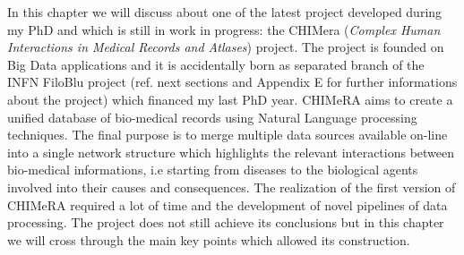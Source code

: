 \documentclass{standalone}
\begin{document}
In this chapter we will discuss about one of the latest project developed during my PhD and which is still in work in progress: the CHIMera (\emph{Complex Human Interactions in Medical Records and Atlases}) project.
The project is founded on Big Data applications and it is accidentally born as separated branch of the INFN FiloBlu project (ref. next sections and Appendix E for further informations about the project) which financed my last PhD year.
CHIMeRA aims to create a unified database of bio-medical records using Natural Language processing techniques.
The final purpose is to merge multiple data sources available on-line into a single network structure which highlights the relevant interactions between bio-medical informations, i.e starting from diseases to the biological agents involved into their causes and consequences.
The realization of the first version of CHIMeRA required a lot of time and the development of novel pipelines of data processing.
The project does not still achieve its conclusions but in this chapter we will cross through the main key points which allowed its construction.

\end{document}
